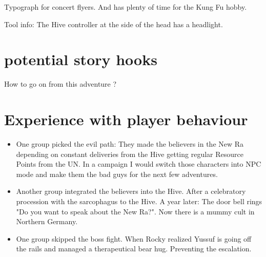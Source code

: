 \begin{npcBox}[title=Norm: Sam]
    \begin{stressSection}
    \end{stressSection}
    \begin{tabularx}{\textwidth}{ XX }
    \end{tabularx}

    \begin{consequences}
    \item {}
    \item {}
    \item {}
    \end{consequences}

    \begin{npcDescription}

    Typograph for concert flyers. And has plenty of time for the Kung Fu hobby.

    Tool info: The Hive controller at the side of the head has a headlight.

    \end{npcDescription}

\end{npcBox}




















\section{potential story hooks}

How to go on from this adventure ?

\section{Experience with player behaviour}

\begin{itemize}
    \item One group picked the evil path: They made the believers in the New Ra depending on constant deliveries from the Hive getting regular Resource Points from the UN. In a campaign I would switch those characters into NPC mode and make them the bad guys for the next few adventures.
    \item Another group integrated the believers into the Hive. After a celebratory procession with the sarcophagus to the Hive. A year later: The door bell rings "Do you want to speak about the New Ra?". Now there is a mummy cult in Northern Germany.
    \item One group skipped the boss fight. When Rocky realized Yussuf is going off the rails and managed a therapeutical bear hug. Preventing the escalation.
\end{itemize}


